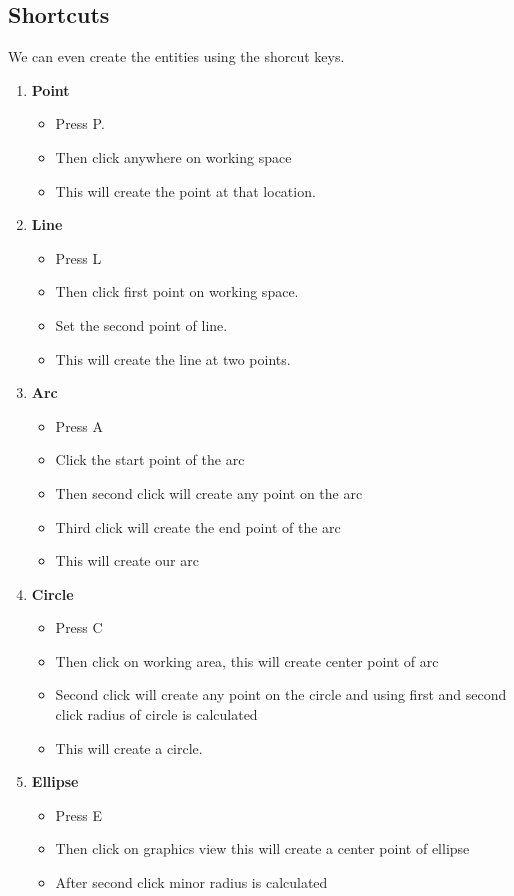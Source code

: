 \subsection{Shortcuts}
We can even create the entities using the shorcut keys.
\begin{enumerate}
\item \textbf{Point}
\begin{itemize}
\item Press P.
\item Then click anywhere on working space
\item This will create the point at that location.
\end{itemize}
\item \textbf{Line}
\begin{itemize}
\item Press L
\item Then click first point on working space.
\item Set the second point of line.
\item This will create the line at two points.
\end{itemize}
\item \textbf{Arc}
\begin{itemize}
\item Press A
\item Click the start point of the arc
\item Then second click will create any point on the arc
\item Third click will create the end point of the arc
\item This will create our arc
\end{itemize}
\item \textbf{Circle}
\begin{itemize}
\item Press C
\item Then click on working area, this will create center point of arc
\item Second click will create any point on the circle and using first and second click radius of circle is calculated
\item This will create a circle.
\end{itemize}
\item \textbf{Ellipse}
\begin{itemize}
\item Press E
\item Then click on graphics view this will create a center point of ellipse
\item After second click minor radius is calculated

\end{itemize}
\end{enumerate}
